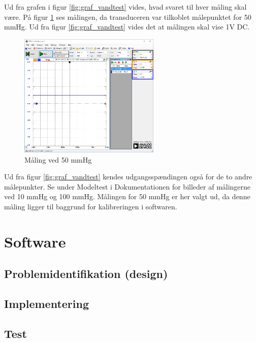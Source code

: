 Ud fra grafen i figur \ref{fig:graf_vandtest} vides, hvad svaret til hver måling skal være. På figur \ref{fig:vandtest_måling50} ses målingen, da transduceren var tilkoblet målepunktet for 50 mmHg. Ud fra figur \ref{fig:graf_vandtest} vides det at målingen skal vise 1V DC.  
\begin{figure}[H]
	\centering	\includegraphics[width=0.6\textwidth]{Figurer/50mmhg}
	\caption{Måling ved 50 mmHg}
	\label{fig:vandtest_måling50}
\end{figure}
Ud fra figur \ref{fig:graf_vandtest} kendes udgangsspændingen også for de to andre målepunkter. Se under Modeltest i Dokumentationen for billeder af målingerne ved 10 mmHg og 100 mmHg. Målingen for 50 mmHg er her valgt ud, da denne måling ligger til baggrund for kalibreringen i softwaren. 

\section{Software}
\subsection{Problemidentifikation (design)}
\subsection{Implementering}
\subsection{Test}

